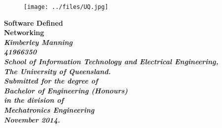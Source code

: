 \begin{titlepage}
\renewcommand{\baselinestretch}{1.0}
\begin{figure}[h]
\centering
\texttt{[image: ../files/UQ.jpg]}
\end{figure}
\begin{center}
\vspace*{35mm}
\Huge\bf
        Software Defined \\
        Networking \\
\vspace{20mm}
\large\sl
        Kimberley Manning \\
        41966350
                \bigskip\\
\rm
                School of Information Technology and Electrical Engineering,\\
                The University of Queensland.\\
\vspace{30mm}   
                Submitted for the degree of\\
                Bachelor of Engineering (Honours)
                \smallskip\\
\normalsize
                in the division of\\
                Mechatronics Engineering
                \medskip\\
\large
                November 2014.
\end{center}
\end{titlepage}

\pagestyle{fancy}
\fancyfoot{}
\fancyhead{}
\renewcommand{\headrulewidth}{0pt}
\fancyfoot[C] {\footnotesize \thepage}

\cleardoublepage


